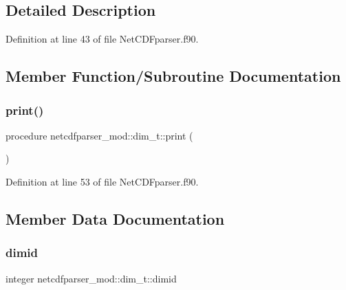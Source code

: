 \subsection{Detailed Description}


Definition at line 43 of file Net\+C\+D\+Fparser.\+f90.



\subsection{Member Function/\+Subroutine Documentation}
\mbox{\label{structnetcdfparser__mod_1_1dim__t_aeb8d02051698385d0c46029a9a39c30f}} 
\subsubsection{\texorpdfstring{print()}{print()}}
{\footnotesize\ttfamily procedure netcdfparser\+\_\+mod\+::dim\+\_\+t\+::print (\begin{DoxyParamCaption}{ }\end{DoxyParamCaption})\hspace{0.3cm}{\ttfamily [private]}}



Definition at line 53 of file Net\+C\+D\+Fparser.\+f90.



\subsection{Member Data Documentation}
\mbox{\label{structnetcdfparser__mod_1_1dim__t_ae0eee1b309e61daefc73868795c35cc9}} 
\subsubsection{\texorpdfstring{dimid}{dimid}}
{\footnotesize\ttfamily integer netcdfparser\+\_\+mod\+::dim\+\_\+t\+::dimid\hspace{0.3cm}{\ttfamily [private]}}




